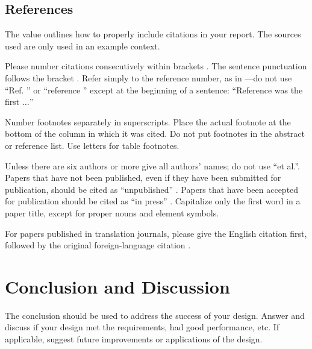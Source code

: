 \subsection{References}
The value outlines how to properly include citations in your report. The sources used are only used in an example context.

Please number citations consecutively within brackets \cite{halter2008electrical}. The sentence punctuation follows the bracket \cite{jossinet1998impedivity}. Refer simply to the reference number, as in \cite{cole1941dispersion}---do not use ``Ref. \cite{cole1941dispersion}'' or ``reference \cite{cole1941dispersion}'' except at the beginning of a sentence: ``Reference \cite{cole1941dispersion} was the first $\ldots$''



Number footnotes separately in superscripts. Place the actual footnote at 
the bottom of the column in which it was cited. Do not put footnotes in the 
abstract or reference list. Use letters for table footnotes.



Unless there are six authors or more give all authors' names; do not use 
``et al.''. Papers that have not been published, even if they have been 
submitted for publication, should be cited as ``unpublished'' \cite{gabriel1996dielectricI}. Papers 
that have been accepted for publication should be cited as ``in press'' \cite{gabriel1996dielectricI}. 
Capitalize only the first word in a paper title, except for proper nouns and 
element symbols.



For papers published in translation journals, please give the English 
citation first, followed by the original foreign-language citation \cite{khadem2019geometric}.












\section{Conclusion and Discussion}
The conclusion should be used to address the success of your design. Answer and discuss if your design met the requirements, had good performance, etc. If applicable, suggest future improvements or applications of the design.












